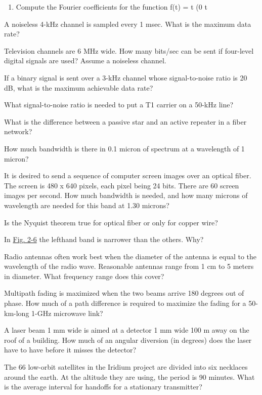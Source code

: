 \begin{enumerate}
\def\labelenumi{\arabic{enumi}.}
\item
  {}

Compute the Fourier coefficients for the function {f}({t}) = {t} (0
{t}
\end{enumerate}

A noiseless 4-kHz channel is sampled every 1 msec. What is the maximum
data rate?

Television channels are 6 MHz wide. How many bits/sec can be sent if
four-level digital signals are used? Assume a noiseless channel.

If a binary signal is sent over a 3-kHz channel whose signal-to-noise
ratio is 20 dB, what is the maximum achievable data rate?

What signal-to-noise ratio is needed to put a T1 carrier on a 50-kHz
line?

What is the difference between a passive star and an active repeater in
a fiber network?

How much bandwidth is there in 0.1 micron of spectrum at a wavelength of
1 micron?

It is desired to send a sequence of computer screen images over an
optical fiber. The screen is 480 x 640 pixels, each pixel being 24 bits.
There are 60 screen images per second. How much bandwidth is needed, and
how many microns of wavelength are needed for this band at 1.30 microns?

Is the Nyquist theorem true for optical fiber or only for copper wire?

In
\protect\hyperlink{0130661023_ch02lev1sec2.htmlux5cux23ch02fig06}{Fig.
2-6} the lefthand band is narrower than the others. Why?

Radio antennas often work best when the diameter of the antenna is equal
to the wavelength of the radio wave. Reasonable antennas range from 1 cm
to 5 meters in diameter. What frequency range does this cover?

Multipath fading is maximized when the two beams arrive 180 degrees out
of phase. How much of a path difference is required to maximize the
fading for a 50-km-long 1-GHz microwave link?

A laser beam 1 mm wide is aimed at a detector 1 mm wide 100 m away on
the roof of a building. How much of an angular diversion (in degrees)
does the laser have to have before it misses the detector?

The 66 low-orbit satellites in the Iridium project are divided into six
necklaces around the earth. At the altitude they are using, the period
is 90 minutes. What is the average interval for handoffs for a
stationary transmitter?

